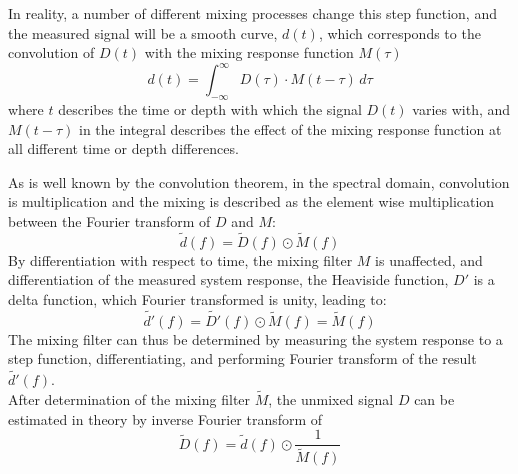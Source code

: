 \documentclass[../../CompleteThesis2/Complete_2ndDraft]{subfiles}
\begin{document}
In reality, a number of different mixing processes change this step function, and the measured signal will be a smooth curve, $d(t)$, which corresponds to the convolution of $D(t)$ with the mixing response function $M(\tau)$
\begin{equation}
	d(t) = \int_{- \infty}^{\infty} D(\tau) \cdot M(t - \tau)\, d\tau
\end{equation}
where $t$ describes the time or depth with which the signal $D(t)$ varies with, and $M(t-\tau)$ in the integral describes the effect of the mixing response function at all different time or depth differences. 


As is well known by the convolution theorem, in the spectral domain, convolution is multiplication and the mixing is described as the element wise multiplication between the Fourier transform of $D$ and $M$:
\begin{equation}
	\tilde{d}(f) = \tilde{D}(f) \odot \tilde{M}(f)
\end{equation}
By differentiation with respect to time, the mixing filter $M$ is unaffected, and differentiation of the measured system response, the Heaviside function, $D'$ is a delta function, which Fourier transformed is unity, leading to:
\begin{equation}
	\tilde{d'}(f) = \tilde{D'}(f) \odot \tilde{M}(f) = \tilde{M}(f)
\end{equation}
The mixing filter can thus be determined by measuring the system response to a step function, differentiating, and performing Fourier transform of the result $\tilde{d'}(f)$.\\
After determination of the mixing filter $\tilde{M}$, the unmixed signal $D$ can be estimated in theory by inverse Fourier transform of
\begin{equation}
	\tilde{D}(f) = \tilde{d}(f)\odot\frac{1}{\tilde{M}(f)}
	\label{eq:Restoration}
\end{equation}
\end{document}
